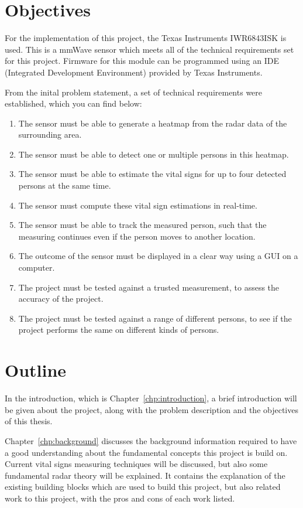 \section{Objectives}
For the implementation of this project, the Texas Instruments IWR6843ISK is used. This is a mmWave sensor which meets all of the technical requirements set for this project. Firmware for this module can be programmed using an IDE (Integrated Development Environment) provided by Texas Instruments.

From the inital problem statement, a set of technical requirements were established, which you can find below:

\begin{enumerate}
    \item The sensor must be able to generate a heatmap from the radar data of the surrounding area.
    \item The sensor must be able to detect one or multiple persons in this heatmap.
    \item The sensor must be able to estimate the vital signs for up to four detected persons at the same time.
    \item The sensor must compute these vital sign estimations in real-time.
    \item The sensor must be able to track the measured person, such that the measuring continues even if the person moves to another location.
    \item The outcome of the sensor must be displayed in a clear way using a GUI on a computer.
    \item The project must be tested against a trusted measurement, to assess the accuracy of the project.
    \item The project must be tested against a range of different persons, to see if the project performs the same on different kinds of persons.
\end{enumerate}

\section{Outline}
In the introduction, which is Chapter~\ref{chp:introduction}, a brief introduction will be given about the project, along with the problem description and the objectives of this thesis.

Chapter~\ref{chp:background} discusses the background information required to have a good understanding about the fundamental concepts this project is build on. Current vital signs measuring techniques will be discussed, but also some fundamental radar theory will be explained. It contains the explanation of the existing building blocks which are used to build this project, but also related work to this project, with the pros and cons of each work listed.

